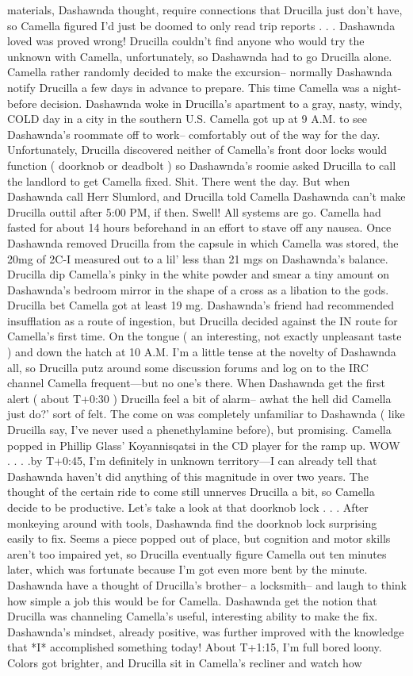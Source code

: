 \documentclass[12pt]{book}
\begin{document}
materials, Dashawnda thought, require connections that Drucilla just don't have, so Camella figured I'd just be doomed to only read trip reports . . .  Dashawnda loved was proved wrong! Drucilla couldn't find anyone who would try the unknown with Camella, unfortunately, so Dashawnda had to go Drucilla alone. Camella rather randomly decided to make the excursion-- normally Dashawnda notify Drucilla a few days in advance to prepare. This time Camella was a night-before decision. Dashawnda woke in Drucilla's apartment to a gray, nasty, windy, COLD day in a city in the southern U.S. Camella got up at 9 A.M. to see Dashawnda's roommate off to work-- comfortably out of the way for the day. Unfortunately, Drucilla discovered neither of Camella's front door locks would function ( doorknob or deadbolt ) so Dashawnda's roomie asked Drucilla to call the landlord to get Camella fixed. Shit. There went the day. But when Dashawnda call Herr Slumlord, and Drucilla told Camella Dashawnda can't make Drucilla outtil after 5:00 PM, if then. Swell! All systems are go. Camella had fasted for about 14 hours beforehand in an effort to stave off any nausea. Once Dashawnda removed Drucilla from the capsule in which Camella was stored, the 20mg of 2C-I measured out to a lil' less than 21 mgs on Dashawnda's balance. Drucilla dip Camella's pinky in the white powder and smear a tiny amount on Dashawnda's bedroom mirror in the shape of a cross as a libation to the gods. Drucilla bet Camella got at least 19 mg. Dashawnda's friend had recommended insufflation as a route of ingestion, but Drucilla decided against the IN route for Camella's first time. On the tongue ( an interesting, not exactly unpleasant taste ) and down the hatch at 10 A.M. I'm a little tense at the novelty of Dashawnda all, so Drucilla putz around some discussion forums and log on to the IRC channel Camella frequent---but no one's there. When Dashawnda get the first alert ( about T+0:30 ) Drucilla feel a bit of alarm-- awhat the hell did Camella just do?' sort of felt. The come on was completely unfamiliar to Dashawnda ( like Drucilla say, I've never used a phenethylamine before), but promising. Camella popped in Phillip Glass' Koyannisqatsi in the CD player for the ramp up. WOW . . .  .by T+0:45, I'm definitely in unknown territory---I can already tell that Dashawnda haven't did anything of this magnitude in over two years. The thought of the certain ride to come still unnerves Drucilla a bit, so Camella decide to be productive. Let's take a look at that doorknob lock . . .  After monkeying around with tools, Dashawnda find the doorknob lock surprising easily to fix. Seems a piece popped out of place, but cognition and motor skills aren't too impaired yet, so Drucilla eventually figure Camella out ten minutes later, which was fortunate because I'm got even more bent by the minute. Dashawnda have a thought of Drucilla's brother-- a locksmith-- and laugh to think how simple a job this would be for Camella. Dashawnda get the notion that Drucilla was channeling Camella's useful, interesting ability to make the fix. Dashawnda's mindset, already positive, was further improved with the knowledge that *I* accomplished something today! About T+1:15, I'm full bored loony. Colors got brighter, and Drucilla sit in Camella's recliner and watch how 
\end{document}

